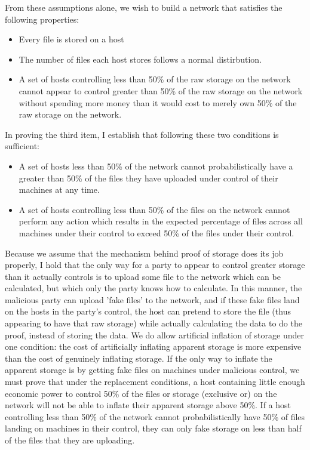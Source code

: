 \documentclass[twocolumn]{article}
\begin{document}
From these assumptions alone, we wish to build a network that satisfies the following properties:
\begin{itemize}
	\item Every file is stored on a host
	\item The number of files each host stores follows a normal distirbution.
	\item A set of hosts controlling less than 50\% of the raw storage on the network cannot appear to control greater than 50\% of the raw storage on the network without spending more money than it would cost to merely own 50\% of the raw storage on the network.
\end{itemize}

In proving the third item, I establish that following these two conditions is sufficient:
\begin{itemize}
	\item A set of hosts less than 50\% of the network cannot probabilistically have a greater than 50\% of the files they have uploaded under control of their machines at any time.
	\item A set of hosts controlling less than 50\% of the files on the network cannot perform any action which results in the expected percentage of files across all machines under their control to exceed 50\% of the files under their control.
\end{itemize}
Because we assume that the mechanism behind proof of storage does its job properly, I hold that the only way for a party to appear to control greater storage than it actually controls is to upload some file to the network which can be calculated, but which only the party knows how to calculate.
In this manner, the malicious party can upload 'fake files' to the network, and if these fake files land on the hosts in the party's control, the host can pretend to store the file (thus appearing to have that raw storage) while actually calculating the data to do the proof, instead of storing the data.
We do allow artificial inflation of storage under one condition: the cost of artificially inflating apparent storage is more expensive than the cost of genuinely inflating storage.
If the only way to inflate the apparent storage is by getting fake files on machines under malicious control, we must prove that under the replacement conditions, a host containing little enough economic power to control 50\% of the files or storage (exclusive or) on the network will not be able to inflate their apparent storage above 50\%.
If a host controlling less than 50\% of the network cannot probabilistically have 50\% of files landing on machines in their control, they can only fake storage on less than half of the files that they are uploading.
\end{document}
